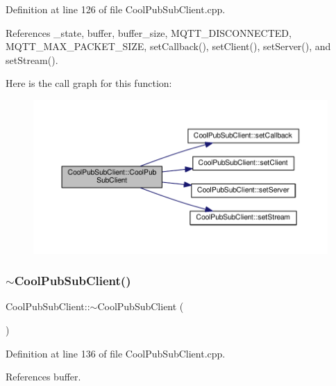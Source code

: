 Definition at line 126 of file Cool\+Pub\+Sub\+Client.\+cpp.



References \+\_\+state, buffer, buffer\+\_\+size, M\+Q\+T\+T\+\_\+\+D\+I\+S\+C\+O\+N\+N\+E\+C\+T\+ED, M\+Q\+T\+T\+\_\+\+M\+A\+X\+\_\+\+P\+A\+C\+K\+E\+T\+\_\+\+S\+I\+ZE, set\+Callback(), set\+Client(), set\+Server(), and set\+Stream().

Here is the call graph for this function\+:\nopagebreak
\begin{figure}[H]
\begin{center}
\leavevmode
\includegraphics[width=350pt]{d8/d4b/class_cool_pub_sub_client_a6466f55abe5820d410b1c9cf7a70ec7e_cgraph}
\end{center}
\end{figure}
\mbox{\label{class_cool_pub_sub_client_aa9404bea508c0755d3d3ea29e921d60f}} 
\subsubsection{\texorpdfstring{$\sim$\+Cool\+Pub\+Sub\+Client()}{~CoolPubSubClient()}}
{\footnotesize\ttfamily Cool\+Pub\+Sub\+Client\+::$\sim$\+Cool\+Pub\+Sub\+Client (\begin{DoxyParamCaption}{ }\end{DoxyParamCaption})}



Definition at line 136 of file Cool\+Pub\+Sub\+Client.\+cpp.



References buffer.



